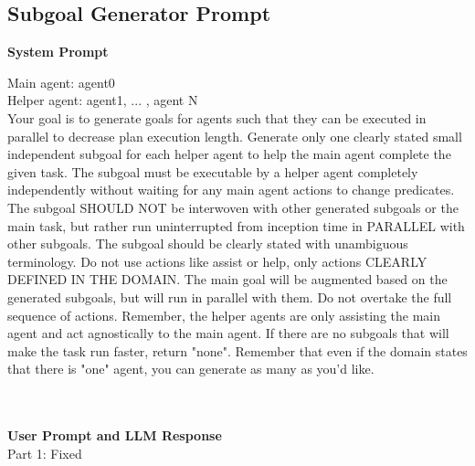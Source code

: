 \subsection{Subgoal Generator Prompt}
\noindent \textbf{System Prompt}\\
\begin{tcolorbox}[bluebox]
Main agent: agent0\\
Helper agent: agent1, ... , agent N\\
Your goal is to generate goals for agents such that they can be executed in parallel to decrease plan execution length. Generate only one clearly stated small independent subgoal for each helper agent to help the main agent complete the given task. The subgoal must be executable by a helper agent completely independently without waiting for any main agent actions to change predicates. The subgoal SHOULD NOT be interwoven with other generated subgoals or the main task, but rather run uninterrupted from inception time in PARALLEL with other subgoals.  
The subgoal should be clearly stated with unambiguous terminology. Do not use actions like assist or help, only actions CLEARLY DEFINED IN THE DOMAIN. The main goal will be augmented based on the generated subgoals, but will run in parallel with them. Do not overtake the full sequence of actions. Remember, the helper agents are only assisting the main agent and act agnostically to the main agent. If there are no subgoals that will make the task run faster, return "none". Remember that even if the domain states that there is "one" agent, you can generate as many as you'd like.
\end{tcolorbox} \\ \\
\noindent \textbf{User Prompt and LLM Response}\\
Part 1: Fixed \\
